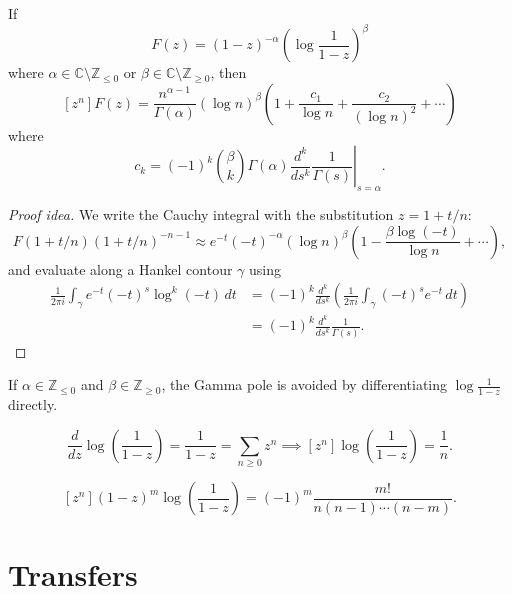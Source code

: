 
\begin{proposition}
    If
    \[
        F(z) = (1-z)^{-\alpha} \left( \log \frac{1}{1-z} \right)^\beta
    \]
    where \(\alpha \in \mathbb{C} \setminus \mathbb{Z}_{\le 0}\) or \(\beta \in \mathbb{C} \setminus \mathbb{Z}_{\ge 0}\), then
    \[
        [z^n] F(z) = \frac{n^{\alpha - 1}}{\Gamma(\alpha)} \left( \log n \right)^\beta \left( 1 + \frac{c_1}{\log n} + \frac{c_2}{(\log n)^2} + \cdots \right)
    \]
    where
    \[
        c_k = (-1)^k \binom{\beta}{k} \Gamma(\alpha) \left. \frac{d^k}{ds^k} \frac{1}{\Gamma(s)} \right|_{s = \alpha}.
    \]
\end{proposition}

\begin{proof}[Proof idea]
    We write the Cauchy integral with the substitution \(z = 1 + t/n\):
    \[
        F(1 + t/n)(1 + t/n)^{-n-1} \approx e^{-t} (-t)^{-\alpha} (\log n)^\beta \left( 1 - \frac{\beta \log(-t)}{\log n} + \cdots \right),
    \]
    and evaluate along a Hankel contour \(\gamma\) using
    \begin{align*}
        \frac{1}{2\pi i} \int_{\gamma} e^{-t} (-t)^s \log^k(-t) \, dt
        &= (-1)^k \frac{d^k}{ds^k} \left( \frac{1}{2\pi i} \int_{\gamma} (-t)^s e^{-t} \, dt \right) \\
        &= (-1)^k \frac{d^k}{ds^k} \frac{1}{\Gamma(s)}.
    \end{align*}
\end{proof}

\begin{remark}
    If \(\alpha \in \mathbb{Z}_{\le 0}\) and \(\beta \in \mathbb{Z}_{\ge 0}\), the Gamma pole is avoided by differentiating \(\log \frac{1}{1-z}\) directly.
\end{remark}

\begin{example}
    \[
        \frac{d}{dz} \log\left(\frac{1}{1-z}\right) = \frac{1}{1-z} = \sum_{n \ge 0} z^n \implies [z^n] \log\left(\frac{1}{1-z}\right) = \frac{1}{n}.
    \]
\end{example}

\begin{example}
    \[
        [z^n] (1-z)^m \log\left(\frac{1}{1-z}\right) = (-1)^m \frac{m!}{n(n-1)\cdots(n-m)}.
    \]
\end{example}

\section*{Transfers}

